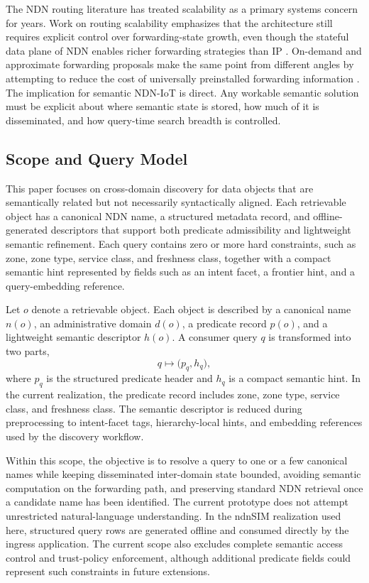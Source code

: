 \documentclass[journal]{IEEEtran}
\begin{document}
The NDN routing literature has treated scalability as a primary systems concern for years. Work on routing scalability emphasizes that the architecture still requires explicit control over forwarding-state growth, even though the stateful data plane of NDN enables richer forwarding strategies than IP \cite{routing_scalability,scalable_forwarding}. On-demand and approximate forwarding proposals make the same point from different angles by attempting to reduce the cost of universally preinstalled forwarding information \cite{odr,samba}. The implication for semantic NDN-IoT is direct. Any workable semantic solution must be explicit about where semantic state is stored, how much of it is disseminated, and how query-time search breadth is controlled.

\subsection{Scope and Query Model}

This paper focuses on cross-domain discovery for data objects that are semantically related but not necessarily syntactically aligned. Each retrievable object has a canonical NDN name, a structured metadata record, and offline-generated descriptors that support both predicate admissibility and lightweight semantic refinement. Each query contains zero or more hard constraints, such as zone, zone type, service class, and freshness class, together with a compact semantic hint represented by fields such as an intent facet, a frontier hint, and a query-embedding reference.

Let $o$ denote a retrievable object. Each object is described by a canonical name $n(o)$, an administrative domain $d(o)$, a predicate record $p(o)$, and a lightweight semantic descriptor $h(o)$. A consumer query $q$ is transformed into two parts,
\begin{equation}
q \mapsto \bigl(p_q,h_q\bigr),
\end{equation}
where $p_q$ is the structured predicate header and $h_q$ is a compact semantic hint. In the current realization, the predicate record includes zone, zone type, service class, and freshness class. The semantic descriptor is reduced during preprocessing to intent-facet tags, hierarchy-local hints, and embedding references used by the discovery workflow.

Within this scope, the objective is to resolve a query to one or a few canonical names while keeping disseminated inter-domain state bounded, avoiding semantic computation on the forwarding path, and preserving standard NDN retrieval once a candidate name has been identified. The current prototype does not attempt unrestricted natural-language understanding. In the ndnSIM realization used here, structured query rows are generated offline and consumed directly by the ingress application. The current scope also excludes complete semantic access control and trust-policy enforcement, although additional predicate fields could represent such constraints in future extensions.
\end{document}
